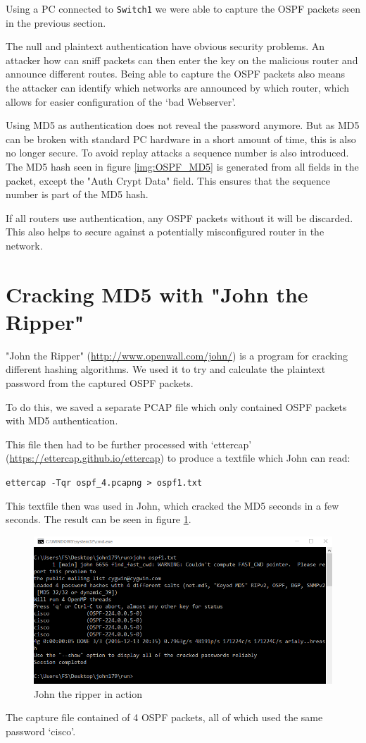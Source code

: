 Using a PC connected to \texttt{Switch1} we were able to capture the OSPF packets seen in the previous section.

The null and plaintext authentication have obvious security problems. An attacker how can sniff packets can then enter the key on the malicious router and announce different routes.
Being able to capture the OSPF packets also means the attacker can identify which networks are announced by which router, which allows for easier configuration of the `bad Webserver'.

Using MD5 as authentication does not reveal the password anymore. But as MD5 can be broken with standard PC hardware in a short amount of time, this is also no longer secure. To avoid replay attacks a sequence number is also introduced. The MD5 hash seen in figure \ref{img:OSPF_MD5} is generated from all fields in the packet, except the "Auth Crypt Data" field. This ensures that the sequence number is part of the MD5 hash.

If all routers use authentication, any OSPF packets without it will be discarded. This also helps to secure against a potentially misconfigured router in the network.

\section{Cracking MD5 with "John the Ripper"}

"John the Ripper" (\url{http://www.openwall.com/john/}) is a program for cracking different hashing algorithms. We used it to try and calculate the plaintext password from the captured OSPF packets.

To do this, we saved a separate PCAP file which only contained \ac{OSPF} packets with MD5 authentication.

This file then had to be further processed with `ettercap' (\url{https://ettercap.github.io/ettercap}) to produce a textfile which John can read:

\texttt{ettercap -Tqr ospf\_4.pcapng > ospf1.txt}

This textfile then was used in John, which cracked the MD5 seconds in a few seconds. The result can be seen in figure \ref{img:john}.

\begin{figure}[H]
	\centering
	\includegraphics[width=1.0\textwidth]{img/john.png}
	\caption{John the ripper in action}
	\label{img:john}
\end{figure}

The capture file contained of 4 OSPF packets, all of which used the same password `cisco'.
